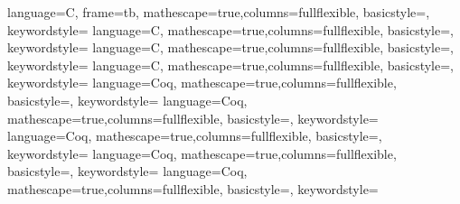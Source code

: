 

{
language=C,
frame=tb,
mathescape=true,columns=fullflexible,
basicstyle=\ttfamily\footnotesize,
keywordstyle=\ttfamily\footnotesize\bfseries
}
{
language=C,
mathescape=true,columns=fullflexible,
basicstyle=\ttfamily,
keywordstyle=\ttfamily
}
{
language=C,
mathescape=true,columns=fullflexible,
basicstyle=\ttfamily\scriptsize,
keywordstyle=\ttfamily\scriptsize
}
{
language=C,
mathescape=true,columns=fullflexible,
basicstyle=\ttfamily\small,
keywordstyle=\ttfamily\small\bfseries
}
{
language=Coq,
mathescape=true,columns=fullflexible,
basicstyle=\sffamily,
keywordstyle=\sffamily
}
{
language=Coq,
mathescape=true,columns=fullflexible,
basicstyle=\sffamily,
keywordstyle=\sffamily\bfseries
}
{
language=Coq,
mathescape=true,columns=fullflexible,
basicstyle=\sffamily,
keywordstyle=\sffamily
}
{
language=Coq,
mathescape=true,columns=fullflexible,
basicstyle=\sffamily,
keywordstyle=\sffamily\bfseries
}
{
language=Coq,
mathescape=true,columns=fullflexible,
basicstyle=\sffamily\scriptsize,
keywordstyle=\sffamily\scriptsize
}



\newcommand{\Ccode}[1]{\lstinline[language=C]{#1}}
\newcommand{\Coqcode}[1]{\lstinline[style=CoqTheorem-inline]{#1}}
